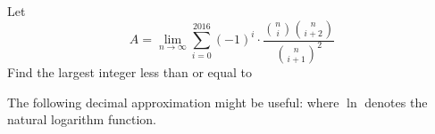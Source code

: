 Let
\[
A = \lim_{n \rightarrow \infty} \sum_{i=0}^{2016} (-1)^i \cdot \frac{\binom{n}{i}\binom{n}{i+2}}{\binom{n}{i+1}^2}
\]Find the largest integer less than or equal to 

The following decimal approximation might be useful:  where $\ln$ denotes the natural logarithm function.